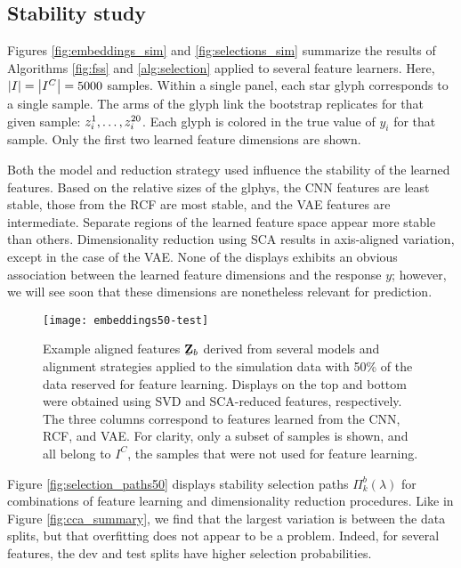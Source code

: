 \subsection{Stability study}

Figures \ref{fig:embeddings_sim} and \ref{fig:selections_sim} summarize the
results of Algorithms \ref{fig:fss} and \ref{alg:selection} applied to several
feature learners. Here, $\left|I\right| = \left|I^{C}\right| = 5000$ samples. Within a
single panel, each star glyph corresponds to a single sample. The arms of the
glyph link the bootstrap replicates for that given sample: $\protect z_{i}^{1},
\dots, z_{i}^{20}$. Each glyph is colored in the true value of $y_{i}$ for that
sample. Only the first two learned feature dimensions are shown.

Both the model and reduction strategy used influence the stability of the
learned features. Based on the relative sizes of the glphys, the CNN features
are least stable, those from the RCF are most stable, and the VAE features are
intermediate. Separate regions of the learned feature space appear more stable
than others. Dimensionality reduction using SCA results in axis-aligned
variation, except in the case of the VAE. None of the displays exhibits an
obvious association between the learned feature dimensions and the response $y$;
however, we will see soon that these dimensions are nonetheless relevant for
prediction.

\begin{figure}
  \centering
  \texttt{[image: embeddings50-test]}
  \caption{Example aligned features
    $\protect\underaccent{\bar}{\mathbf{Z}}_{b}$ derived from several models
    and alignment strategies applied to the simulation data with 50\% of the
    data reserved for feature learning. Displays on the top and bottom were
    obtained using SVD and SCA-reduced features, respectively. The three columns
    correspond to features learned from the CNN, RCF, and VAE. For clarity, only
    a subset of samples is shown, and all belong to $I^{C}$, the samples that
    were not used for feature learning.}
  \label{fig:embeddings50-test}
\end{figure}

 Figure \ref{fig:selection_paths50} displays stability selection paths
 $\Pi_{k}^{b}\left(\lambda\right)$ for combinations of feature learning and
 dimensionality reduction procedures. Like in Figure \ref{fig:cca_summary}, we
 find that the largest variation is between the data splits, but that
 overfitting does not appear to be a problem. Indeed, for several features, the
 dev and test splits have higher selection probabilities.


